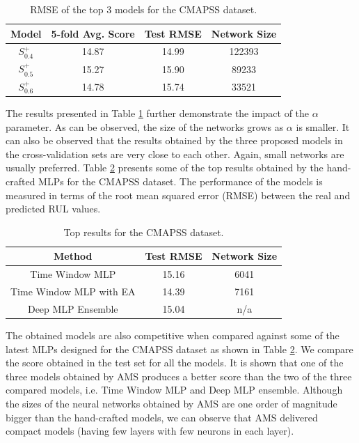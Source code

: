 \documentclass[12pt]{elsart}%
\begin{document}
\begin{table}[!htb]
\begin{center}
\caption{RMSE of the top 3 models for the CMAPSS dataset.}
\label{table:avg_rmse_cmapss}
\vspace{12pt}
\begin{tabular}{| c | c | c | c |}
\hline
Model & 5-fold Avg. Score & Test RMSE & Network Size\\
\hline
$S^+_{0.4}$ & 14.87 & 14.99 & 122393\\
$S^+_{0.5}$ & 15.27 & 15.90 & 89233\\
$S^+_{0.6}$ & 14.78 & 15.74 & 33521\\
\hline
\end{tabular}
\end{center}
\end{table}

The results presented in Table \ref{table:avg_rmse_cmapss} further demonstrate the impact of the $\alpha$ parameter. As can be observed, the size of the networks grows as $\alpha$ is smaller. It can also be observed that the results obtained by the three proposed models in the cross-validation sets are very close to each other. Again, small networks are usually preferred.
Table \ref{table:CMAPSS_results_top} presents some of the top results obtained by the hand-crafted MLPs for the CMAPSS dataset. The performance of the models is measured in terms of the root mean squared error (RMSE) between the real and predicted RUL values. 

\begin{table}[!htb]
\begin{center}
\caption{Top results for the CMAPSS dataset.}
\label{table:CMAPSS_results_top}
\vspace{12pt}
\begin{tabular}{| c | c | c |}
\hline
Method & Test RMSE & Network Size \\
\hline
Time Window MLP \cite{Lim2016} & 15.16 & 6041\\
Time Window MLP with EA \cite{Laredo2018} & 14.39 & 7161\\
Deep MLP Ensemble \cite{Zhang2016} & 15.04 &  n/a \\
\hline
\end{tabular}
\end{center}
\end{table}

The obtained models are also competitive when compared against some of the latest MLPs designed for the CMAPSS dataset as shown in Table \ref{table:CMAPSS_results_top}. We compare the score obtained in the test set for all the models. It is shown that one of the three models obtained by AMS produces a better score than the two of the three compared models, i.e. Time Window MLP and Deep MLP ensemble. Although the sizes of the neural networks obtained by AMS are one order of magnitude bigger than the hand-crafted models, we can observe that AMS delivered compact models (having few layers with few neurons in each layer).
\end{document}
